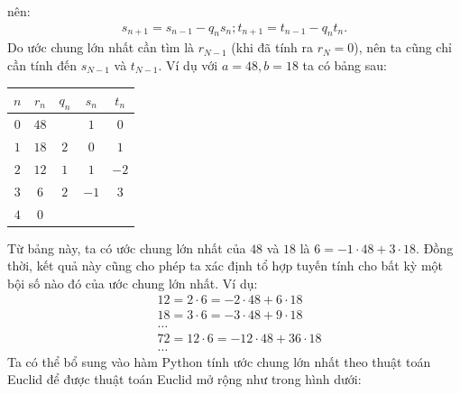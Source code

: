 \begin{multicols}{2}
	nên:
	\begin{align*}
		s_{n+1}=s_{n-1}-q_n s_n;
		t_{n+1}=t_{n-1}-q_n t_n.
	\end{align*}
	Do ước chung lớn nhất cần tìm là $r_{N-1}$ (khi đã tính ra $r_N=0$), nên ta cũng chỉ cần tính đến $s_{N-1}$ và $t_{N-1}$.
	\vskip 0.1cm
	Ví dụ với $a=48,b=18$ ta có bảng sau:
	\begin{table}[H]
		\vspace*{-5pt}
		\centering
		\captionsetup{labelformat= empty, justification=centering}
		\setlength{\tabcolsep}{8pt}
		\renewcommand{\arraystretch}{1.1}
		\begin{tabular}{|c|c|c|c|c|}
			\hline
			$n$	&$r_n$&	$q_n$&	$s_n$&	$t_n$\\
			\hline
			$0$	&$48$&	&	$1$&	$0$\\
			\hline
			$1$	&$18$&	$2$&	$0$&	$1$\\
			\hline
			$2$&	$12$&	$1$&	$1$&	$-2$\\
			\hline
			$3$&	$6$&	$2$&	$-1$&	$3$\\
			\hline
			$4$&	$0$ & & &\\
			\hline	
		\end{tabular}
		\vspace*{-5pt}
	\end{table}		
	Từ bảng này, ta có ước chung lớn nhất của $48$ và $18$ là $6=-1\cdot 48+3\cdot 18$.
	\vskip 0.1cm
	Đồng thời, kết quả này cũng cho phép ta xác định tổ hợp tuyến tính cho bất kỳ một bội số nào đó của ước chung lớn nhất. Ví dụ:
	\begin{align*}
		&12=2\cdot 6=-2\cdot 48+6\cdot 18 \\[-0.4ex]
		&18=3\cdot 6=-3\cdot 48+9\cdot 18 \\[-0.4ex]
		&\ldots\\[-0.4ex]
		&72=12\cdot 6=-12\cdot 48+36\cdot 18 \\[-0.4ex]
		&\ldots
	\end{align*}
	Ta có thể bổ sung vào hàm Python tính ước chung lớn nhất theo thuật toán Euclid để được thuật toán Euclid mở rộng như trong hình dưới:
	\begin{figure}[H]
		\centering
		\vspace*{-5pt}
		\captionsetup{labelformat= empty, justification=centering}

\end{figure}
\end{multicols}
